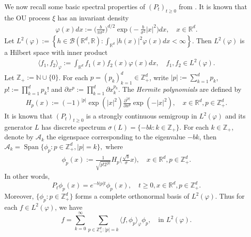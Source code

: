 \documentclass[12pt,a4paper]{amsart}
\theoremstyle{plain}
\theoremstyle{definition}
\numberwithin{equation}{section}
\begin{document}
We now recall some basic spectral properties of $(P_t)_{t\geq 0}$ from \cite{MetafunePallaraPriola2002Spectrum}.
It is known that the OU process $\xi$ has an invariant density
\begin{align}
\label{invariantdensity}
  \varphi(x)dx
  :=\Big (\frac{b}{\pi \sigma^2}\Big )^{d/2}\exp \Big(-\frac{b}{\sigma^2}|x|^2 \Big)dx,
  \quad x\in \mathbb R^d.
\end{align}
Let $L^2(\varphi):= \left\{ h  \in \mathcal B(\mathbb R^d, \mathbb R): \int_{\mathbb R^d} |h(x)|^2 \varphi(x) dx < \infty \right\}$.
Then $L^2(\varphi)$ is a Hilbert space with inner product
\begin{align}
  \langle f_1, f_2 \rangle_{\varphi}
  := \int_{\mathbb R^d}f_1(x)f_2(x)\varphi(x) dx, \quad f_1,f_2 \in L^2(\varphi).
\end{align}
Let $\mathbb Z_+ := \mathbb N\cup\{0\}$.
For each $p = (p_k)_{k = 1}^d \in \mathbb{Z}_+^{d}$, write $|p|:=\sum_{k=1}^d p_k$, $p!:= \prod_{k= 1}^d p_k!$ and $\partial x^p:= \prod_{k = 1}^d\partial x_k^{p_k}$.
The \emph{Hermite polynomials} are defined by
\begin{align}
  H_p(x)
  :=(-1)^{|p|}\exp(|x|^2) \frac{\partial ^{|p|}}{\partial x^p} \exp(-|x|^2) 
  , \quad x\in \mathbb R^d, p \in \mathbb{Z}_+^{d}.
\end{align}
It is known that $(P_t)_{t\geq 0}$ is a strongly continuous semigroup in $L^2(\varphi)$ and its generator $L$ has discrete spectrum $\sigma(L)= \{-bk: k \in \mathbb Z_+\}$.
For each $k \in \mathbb Z_+$, denote by $\mathcal{A}_k$ the eigenspace corresponding to the eigenvalue $-bk$, then
$
\mathcal{A}_k
= \operatorname{Span} \{\phi_p : p\in \mathbb Z_+^d, |p|=k\},
$
where
\begin{align}
  \label{eigenfunction}
  \phi_p(x)
  := \frac{1}{\sqrt{ p! 2^{|p|} }} H_p \Big(\frac{ \sqrt{b} }{\sigma}x \Big)
  , \quad x\in \mathbb R^d, p\in \mathbb Z_+^d.
\end{align}
In other words,
\begin{equation}
  P_t\phi_p(x)
  =e^{-b|p|t}\phi_p(x),
  \quad t\geq 0, x\in \mathbb R^d, p\in \mathbb Z_+^d.
\end{equation}
Moreover, $\{\phi_p: p \in \mathbb Z_+^d\}$ forms a complete orthonormal basis of $L^2(\varphi)$.
Thus for each $f\in L^2(\varphi)$, we have
\begin{equation}
\label{semicomp1}
f
=\sum_{k=0}^{\infty}\sum_{p\in \mathbb Z_+^d:|p|=k}\langle f, \phi_p \rangle_{\varphi} \phi_p
, \quad \text{in~} L^2(\varphi).
\end{equation}
\end{document}
